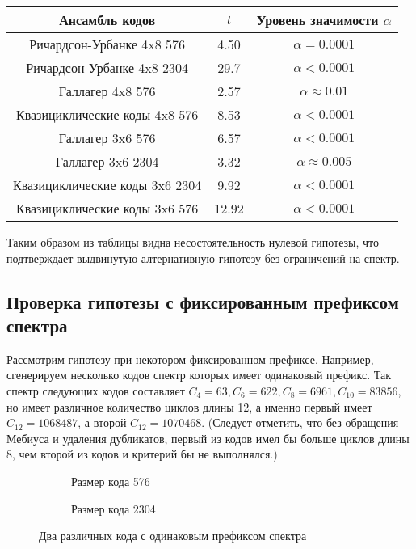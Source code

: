 \begin{tabular}{|c|c|c|}
	\hline
	Ансамбль кодов & $t$ & Уровень значимости $\alpha$\\
	\hline
	Ричардсон-Урбанке 4x8 576 & 4.50 &  $\alpha = 0.0001$\\
	\hline
	Ричардсон-Урбанке 4x8 2304 & 29.7 & $\alpha < 0.0001$ \\
	\hline
	Галлагер 4x8 576 & 2.57 & $\alpha \approx 0.01$ \\
	\hline
	Квазициклические коды 4x8 576 & 8.53 & $\alpha < 0.0001$ \\
	\hline
	Галлагер 3x6 576 & 6.57 & $\alpha < 0.0001$ \\
	\hline
	Галлагер 3x6 2304 & 3.32 & $\alpha \approx 0.005$ \\
	\hline
	Квазициклические коды 3x6 2304 & 9.92 & $\alpha < 0.0001$ \\
	\hline
	Квазициклические коды 3x6 576 & 12.92 & $\alpha < 0.0001$ \\
	\hline
\end{tabular}

Таким образом из таблицы видна несостоятельность нулевой гипотезы, что подтверждает выдвинутую алтернативную
гипотезу без ограничений на спектр.

\subsection{Проверка гипотезы с фиксированным префиксом спектра}

Рассмотрим гипотезу при некотором фиксированном префиксе. Например, сгенерируем несколько кодов
спектр которых имеет одинаковый префикс. Так спектр следующих кодов составляет 
$C_4=63, C_6=622, C_8=6961, C_{10}=83856$, но имеет различное количество циклов
длины 12, а именно первый имеет $C_{12}=1068487$, а второй $C_{12}=1070468$.  (Следует отметить, что без обращения Мебиуса и удаления дубликатов, первый из кодов имел бы больше
циклов длины 8, чем второй из кодов и критерий бы не выполнялся.)

\begin{figure}[h!]
\centering
\begin{subfigure}{.5\textwidth}
  \centering
  \caption{Размер кода 576}
\end{subfigure}%
\begin{subfigure}{.5\textwidth}
  \centering
  \caption{Размер кода 2304}
\end{subfigure}
\caption{Два различных кода с одинаковым префиксом спектра}
\end{figure}

